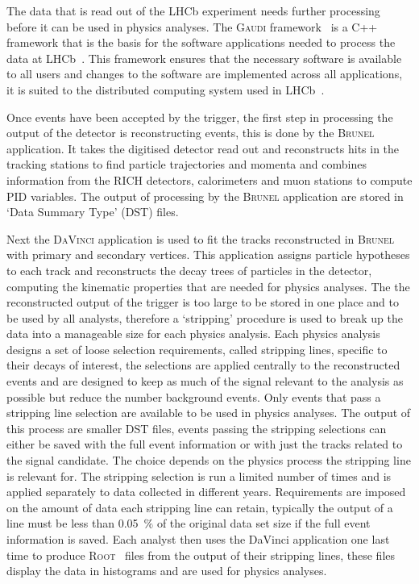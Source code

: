 The data that is read out of the LHCb experiment needs further processing before it can be used in physics analyses. The \textsc{Gaudi} framework~\cite{Mato:1998gfa} is a C++ framework that is the basis for the software applications needed to process the data at LHCb~\cite{Antunes-Nobrega:835156}. This framework ensures that the necessary software is available to all users and changes to the software are implemented across all applications, it is suited to the distributed computing system used in LHCb~\cite{Stagni:2012rs}. 


Once events have been accepted by the trigger, the first step in processing the output of the detector is reconstructing events, this is done by the \textsc{Brunel} application. It takes the digitised detector read out and reconstructs hits in the tracking stations to find particle trajectories and momenta and combines information from the RICH detectors, calorimeters and muon stations to compute PID variables. The output of processing by the \textsc{Brunel} application are stored in `Data Summary Type' (DST) files. 

Next the \textsc{DaVinci} application is used to fit the tracks reconstructed in \textsc{Brunel} with primary and secondary vertices. This application assigns particle hypotheses to each track and reconstructs the decay trees of particles in the detector, computing the kinematic properties that are needed for physics analyses. The the reconstructed output of the trigger is too large to be stored in one place and to be used by all analysts, therefore a `stripping' procedure is used to break up the data into a manageable size for  each physics analysis. Each physics analysis designs a set of loose selection requirements, called stripping lines, specific to their decays of interest, the selections are applied centrally to the reconstructed events and are designed to keep as much of the signal relevant to the analysis as possible but reduce the number background events. Only events that pass a stripping line selection are available to be used in physics analyses. The output of this process are smaller DST files, events passing the stripping selections can either be saved with the full event information or with just the tracks related to the signal candidate. The choice depends on the physics process the stripping line is relevant for. The stripping selection is run a limited number of times and is applied separately to data collected in different years. Requirements are imposed on the amount of data each stripping line can retain, typically the output of a line must be less than 0.05~$\%$ of the original data set size if the full event information is saved. Each analyst then uses the DaVinci application one last time to produce \textsc{Root}~\cite{Brun:1997pa} files from the output of their stripping lines, these files display the data in histograms and are used for physics analyses. %


